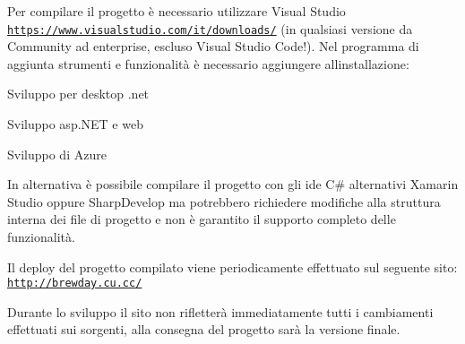 Per compilare il progetto è necessario utilizzare Visual Studio \href{https://www.visualstudio.com/it/downloads/}{\tt https\+://www.\+visualstudio.\+com/it/downloads/} (in qualsiasi versione da Community ad enterprise, escluso Visual Studio Code!). Nel programma di aggiunta strumenti e funzionalità è necessario aggiungere all\textquotesingle{}installazione\+:
\begin{DoxyItemize}
\item Sviluppo per desktop .net
\item Sviluppo asp.\+N\+ET e web
\item Sviluppo di Azure
\end{DoxyItemize}

In alternativa è possibile compilare il progetto con gli ide C\# alternativi Xamarin Studio oppure Sharp\+Develop ma potrebbero richiedere modifiche alla struttura interna dei file di progetto e non è garantito il supporto completo delle funzionalità.

Il deploy del progetto compilato viene periodicamente effettuato sul seguente sito\+: \href{http://brewday.cu.cc/}{\tt http\+://brewday.\+cu.\+cc/}

Durante lo sviluppo il sito non rifletterà immediatamente tutti i cambiamenti effettuati sui sorgenti, alla consegna del progetto sarà la versione finale. 